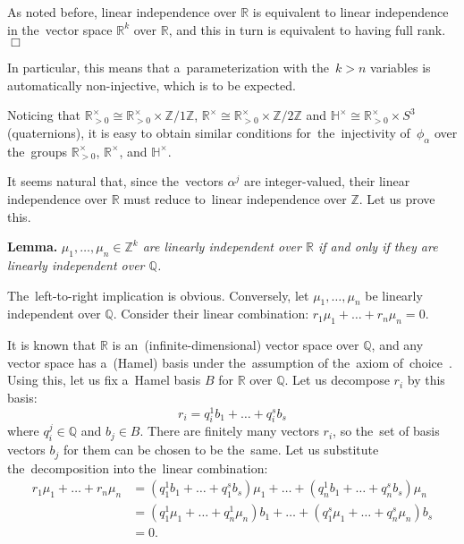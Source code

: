 \documentclass[twoside]{article}
\begin{document}
    As noted before, linear independence over $\mathbb{R}$ is equivalent to linear independence
    in the~vector space $\mathbb{R}^k$ over $\mathbb{R}$, and this in turn is equivalent to having full rank.
\hfill$\Box$\medskip

In particular, this means that a~parameterization with the~$k > n$ variables is automatically
non-injective, which is to be expected.

Noticing that $\mathbb{R}_{>0}^\times \cong \mathbb{R}_{>0}^\times \times \mathbb{Z} / 1\mathbb{Z}$, $\mathbb{R}^\times \cong \mathbb{R}_{>0}^\times \times \mathbb{Z} / 2 \mathbb{Z}$
and $\mathbb{H}^\times \cong \mathbb{R}_{>0}^\times \times S^3$ (quaternions), it is easy to obtain similar conditions for~the~injectivity of~$\phi_\alpha$ over the~groups
$\mathbb{R}_{>0}^\times$, $\mathbb{R}^\times$, and $\mathbb{H}^\times$.

It seems natural that, since the~vectors $\alpha^j$ are integer-valued, their linear independence over $\mathbb{R}$
must reduce to~linear independence over $\mathbb{Z}$. Let us prove this.

\medskip\noindent\textbf{Lemma.}\emph{
    $\mu_1, \ldots, \mu_n \in \mathbb{Z}^k$ are linearly independent over $\mathbb{R}$ if and only if they are linearly independent over $\mathbb{Q}$.
}\medskip

    The~left-to-right implication is obvious. Conversely, let $\mu_1, \ldots, \mu_n$ be linearly independent over $\mathbb{Q}$.
    Consider their linear combination: $r_1 \mu_1 + \ldots + r_n \mu_n = 0$.

    It is known that $\mathbb{R}$ is an~(infinite-dimensional) vector space over $\mathbb{Q}$, and any vector space has
    a~(Hamel) basis under the~assumption of the~axiom of~choice~\cite{Brbk70}. Using this, let us fix a~Hamel basis $B$ for $\mathbb{R}$
    over $\mathbb{Q}$. Let us decompose $r_i$ by this basis:
    $$
        r_i = q_i^1 b_1 + \ldots + q_i^s b_s
    $$
    where $q_i^j \in \mathbb{Q}$ and $b_j \in B$. There are finitely many vectors $r_i$,
    so the~set of basis vectors $b_j$ for them can be chosen to be the~same.
    Let us substitute the~decomposition into the~linear combination:
    \begin{align*}
        r_1 \mu_1 + \ldots + r_n \mu_n & = (q_1^1 b_1 + \ldots + q_1^s b_s) \mu_1 + \ldots + (q_n^1 b_1 + \ldots + q_n^s b_s) \mu_n \\
                                       & = (q_1^1 \mu_1 + \ldots + q_n^1 \mu_n) b_1 + \ldots + (q_1^s \mu_1 + \ldots + q_n^s \mu_n) b_s \\
                                       & = 0.
    \end{align*}
\end{document}
